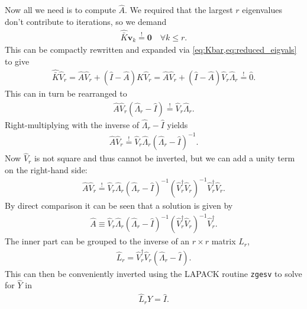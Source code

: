 \documentclass[a4paper, twoside, 10pt, english]{article}
\numberwithin{equation}{section}
\let\vec\symbf
\begin{document}
Now all we need is to compute $\hat{A}$. We required that the largest $r$ eigenvalues don't contribute to iterations, so we demand
\begin{gather}
  \hat{\bar{K}} \vec{v}_{k} \overset{!}{=} \vec{0} \quad \forall k \le r.
\end{gather}
This can be compactly rewritten and expanded via \cref{eq:Kbar,eq:reduced_eigvals} to give
\begin{gather}
  \hat{\bar{K}} \hat{V}_{r} = \hat{A} \hat{V}_{r} + \left ( \hat{I} - \hat{A} \right ) \hat{K} \hat{V}_{r} = \hat{A} \hat{V}_{r} + \left ( \hat{I} - \hat{A} \right ) \hat{V}_{r} \hat{\Lambda}_{r} \overset{!}{=} \hat{0}.
\end{gather}
This can in turn be rearranged to
\begin{gather}
  \hat{A} \hat{V}_{r} \left ( \hat{\Lambda}_{r} - \hat{I} \right ) \overset{!}{=} \hat{V}_{r} \hat{\Lambda}_{r}.
\end{gather}
Right-multiplying with the inverse of $\hat{\Lambda}_{r} - \hat{I}$ yields
\begin{gather}
  \hat{A} \hat{V}_{r} \overset{!}{=} \hat{V}_{r} \hat{\Lambda}_{r} \left ( \hat{\Lambda}_{r} - \hat{I} \right )^{-1}.
\end{gather}
Now $\hat{V}_{r}$ is not square and thus cannot be inverted, but we can add a unity term on the right-hand side:
\begin{gather}
  \hat{A} \hat{V}_{r} \overset{!}{=} \hat{V}_{r} \hat{\Lambda}_{r} \left ( \hat{\Lambda}_{r} - \hat{I} \right )^{-1} \left ( \hat{V}_{r}^{\dagger} \hat{V}_{r} \right )^{-1} \hat{V}_{r}^{\dagger} \hat{V}_{r}.
\end{gather}
By direct comparison it can be seen that a solution is given by
\begin{gather}
  \hat{A} \equiv \hat{V}_{r} \hat{\Lambda}_{r} \left ( \hat{\Lambda}_{r} - \hat{I} \right )^{-1} \left ( \hat{V}_{r}^{\dagger} \hat{V}_{r} \right )^{-1} \hat{V}_{r}^{\dagger}.
\end{gather}
The inner part can be grouped to the inverse of an $r \times r$ matrix $\hat{L}_{r}$,
\begin{gather}
  \hat{L}_{r} = \hat{V}_{r}^{\dagger} \hat{V}_{r} \left ( \hat{\Lambda}_{r} - \hat{I} \right ).
\end{gather}
This can then be conveniently inverted using the LAPACK routine \texttt{zgesv} to solve for $\hat{Y}$ in
\begin{gather}
  \hat{L}_{r} \hat{Y} = \hat{I}.
\end{gather}
\end{document}

